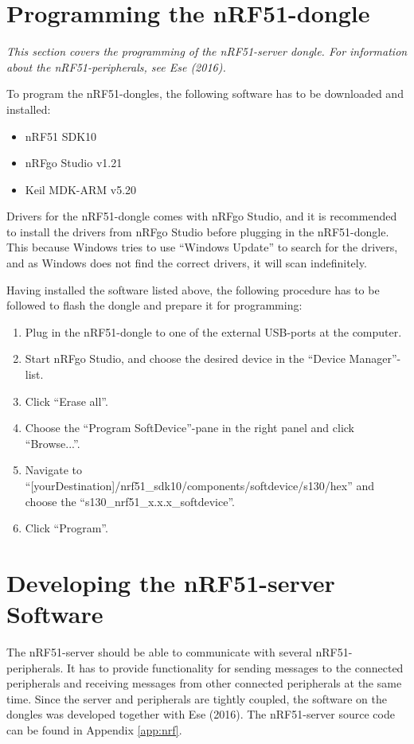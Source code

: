 \section{Programming the nRF51-dongle}
\label{sec:prognrf}
\textit{This section covers the programming of the nRF51-server dongle. For information about the nRF51-peripherals, see Ese (2016).}

\label{sec:nrfrequirements}
To program the nRF51-dongles, the following software has to be downloaded and installed:
\begin{itemize}
    \item nRF51 SDK10\cite{nrf51sdk}
    \item nRFgo Studio v1.21\cite{nrfgo}
    \item Keil MDK-ARM v5.20\cite{keil}
\end{itemize}
Drivers for the nRF51-dongle comes with nRFgo Studio, and it is recommended to install the drivers from nRFgo Studio before plugging in the nRF51-dongle. This because Windows tries to use ``Windows Update'' to search for the drivers, and as Windows does not find the correct drivers, it will scan indefinitely.

Having installed the software listed above, the following procedure has to be followed to flash the dongle and prepare it for programming:
\begin{enumerate}
    \item Plug in the nRF51-dongle to one of the external USB-ports at the computer.
    \item Start nRFgo Studio, and choose the desired device in the ``Device Manager''-list.
    \item Click ``Erase all''.
    \item Choose the ``Program SoftDevice''-pane in the right panel and click ``Browse...''.
    \item Navigate to ``[yourDestination]/nrf51\_sdk10/components/softdevice/s130/hex'' and choose the ``s130\_nrf51\_x.x.x\_softdevice''.
    \item Click ``Program''.
\end{enumerate}

\section{Developing the nRF51-server Software}
\label{sec:devnrf}
The nRF51-server should be able to communicate with several nRF51-peripherals. It has to provide functionality for sending messages to the connected peripherals and receiving messages from other connected peripherals at the same time. Since the server and peripherals are tightly coupled, the software on the dongles was developed together with Ese (2016). The nRF51-server source code can be found in Appendix \ref{app:nrf}.

